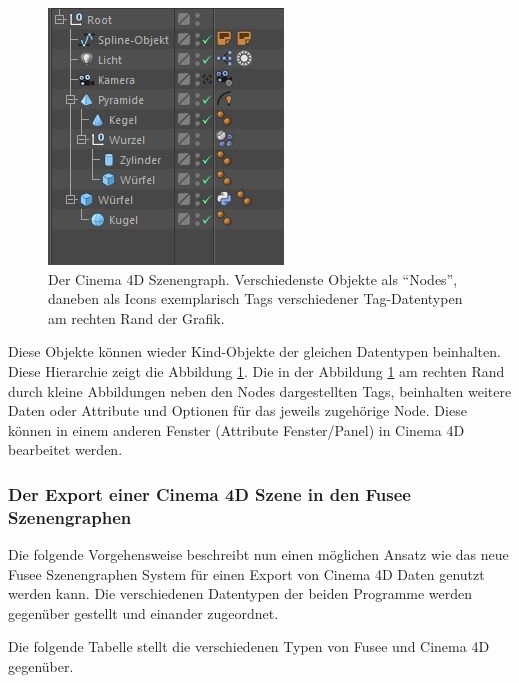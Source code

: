 \documentclass[pagesize, paper=a4, fontsize=12pt, titlepage=true, headings=small, headnosepline, abstractoff, liststotoc, nochapterprefix, plainheadsepline, twoside]{scrreprt}
\begin{document}
\begin{figure}[ht]
	\centering
	\includegraphics{Bilder/c4d_Szenengraph_Vgl.jpg}
	\caption{Der Cinema 4D Szenengraph. Verschiedenste Objekte als “Nodes”, daneben als Icons exemplarisch Tags verschiedener Tag-Datentypen am rechten Rand der Grafik.}
	\label{Cinema 4DSzenenGraph}
\end{figure}

Diese Objekte können wieder Kind-Objekte der gleichen Datentypen beinhalten. Diese Hierarchie zeigt die Abbildung \ref{Cinema 4DSzenenGraph}. Die in der Abbildung \ref{Cinema 4DSzenenGraph} am rechten Rand durch kleine Abbildungen neben den Nodes dargestellten Tags, beinhalten weitere Daten oder Attribute und Optionen für das jeweils zugehörige Node. Diese können in einem anderen Fenster (Attribute Fenster/Panel) in Cinema 4D bearbeitet werden.

\subsubsection{Der Export einer Cinema 4D Szene in den Fusee Szenengraphen}
Die folgende Vorgehensweise beschreibt nun einen möglichen Ansatz wie das neue Fusee Szenengraphen System für einen Export von Cinema 4D Daten genutzt werden kann. Die verschiedenen Datentypen der beiden Programme werden gegenüber gestellt und einander zugeordnet.

Die folgende Tabelle stellt die verschiedenen Typen von Fusee und Cinema 4D gegenüber.
\end{document}
